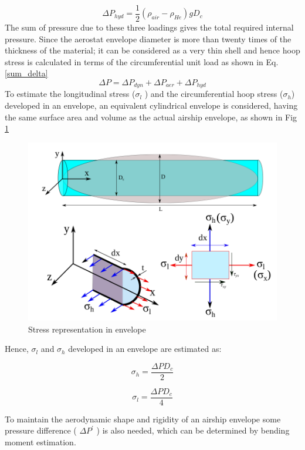 \begin{equation}
\label{hyd}
\Delta P_{hyd} = \frac{1}{2} (\rho _{air} - \rho_{He} ) g D_{c}
\end{equation}
The sum of pressure due to these three loadings gives the total required internal pressure. Since the aerostat envelope diameter is more than twenty times of the thickness of the material; it can be considered as a very thin shell and hence hoop stress is calculated in terms of the circumferential unit load as shown in Eq. \ref{sum_delta}
\begin{equation}
\label{sum_delta}
\Delta P = \Delta P_{dyn} + \Delta P_{aer} + \Delta P_{hyd}
\end{equation}
To estimate the longitudinal stress ($ \sigma _{l} $ ) and the circumferential hoop stress ($ \sigma _{h} $) developed in an envelope, an equivalent cylindrical envelope is considered, having the same surface area and volume as the actual airship envelope, as shown in Fig \ref{Stress representation in envelope}

\begin{figure}[H]
	\centering
	\includegraphics[width=0.7\linewidth]{von_mises/stress_rep_envelope.png}
	\caption{Stress representation in envelope }
	\label{Stress representation in envelope}
\end{figure}
Hence, $ \sigma _{l} $ and $ \sigma _{h} $ developed in an envelope are estimated as:

\begin{equation}
 \sigma _{h} = \frac{\Delta P D_{c}}{2}
\end{equation}

\begin{equation}
\sigma _{l} = \frac{\Delta P D_{c}}{4}
\end{equation}

To maintain the aerodynamic shape and rigidity of an airship envelope some pressure difference ( $ \Delta P^{'} $ ) is also needed, which can be determined by bending moment estimation.

